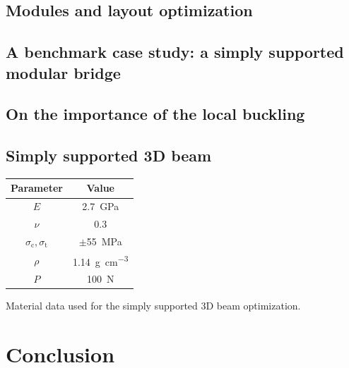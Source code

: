 \begin{figure}
    \hfill
    \hfill
    \caption{}
    \label{fig:06}
\end{figure}
\subsection{Modules and layout optimization}

\subsection{A benchmark case study: a simply supported modular bridge}

\subsection{On the importance of the local buckling}

\subsection{Simply supported 3D beam}
\begin{margintable}
    \small
    \centering
    \begin{tabular}{cc}
    \toprule
    \textbf{Parameter}        & \textbf{Value} \\ \midrule
    $E$              & \qty{2.7}{GPa}     \\
    $\nu$            & 0.3   \\
    $\sigma_\text{c}, \sigma_\text{t}$ & $\pm $\qty{55}{MPa} \\
    $\rho$              & \qty{1.14}{\gram\per\cubic\centi\metre}   \\
    $P$              & \qty{100}{N}   \\
    \bottomrule
    \end{tabular}
    \caption{Material data used for the simply supported 3D beam optimization.}
    \label{tab:06_3D_supp_mat}
\end{margintable}


\section{Conclusion}
